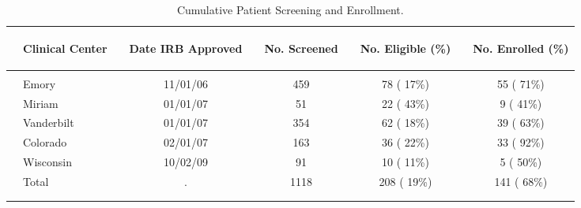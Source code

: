 \documentclass[dvips,10pt]{article}
\begin{document}
\begin{table}[t]
\caption
{ Cumulative Patient Screening and Enrollment. }
\begin{center}
\begin{tabular}{ @{}l@{}
@{}l@{}@{}p{1.5em}@{}@{}c@{}@{}p{1.5em}@{}@{}c@{}@{}p{1.5em}@{}@{}c@{}@{}p{1.5em}@{}@{}c@{}
}
\hline

& \parbox{6em}{\begin{center}Clinical Center\end{center}} && \parbox{6em}{\begin{center}Date IRB Approved\end{center}} && \parbox{6em}{\begin{center}No. Screened\end{center}} && \parbox{6em}{\begin{center}No. Eligible (\%)\end{center}} && \parbox{6em}{\begin{center}No. Enrolled (\%)\end{center}} \\

\hline

\\
& Emory && 11/01/06 && 459 && 78 ( 17\%) && 55 ( 71\%) \\
& Miriam && 01/01/07 && 51 && 22 ( 43\%) && 9 ( 41\%) \\
& Vanderbilt && 01/01/07 && 354 && 62 ( 18\%) && 39 ( 63\%) \\
& Colorado && 02/01/07 && 163 && 36 ( 22\%) && 33 ( 92\%) \\
& Wisconsin && 10/02/09 && 91 && 10 ( 11\%) && 5 ( 50\%) \\
& Total && . && 1118 && 208 ( 19\%) && 141 ( 68\%) \\
\\
\hline \\

\end{tabular}

\end{center}
 \end{table}
\end{document}
